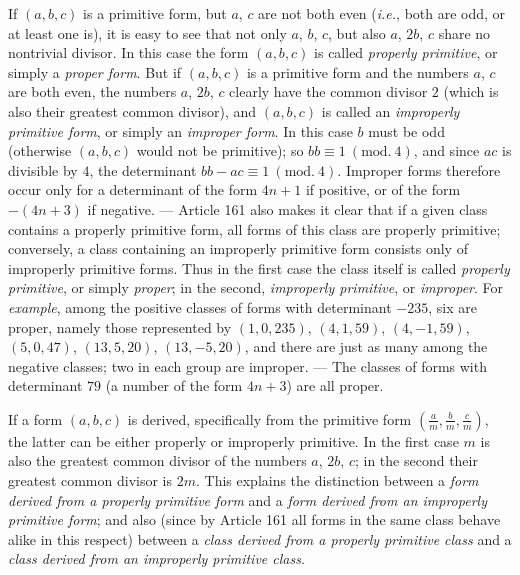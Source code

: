 If $(a,b,c)$ is a primitive form, but $a$, $c$ are not both even (\textit{i.e.}, both are odd, or at least one is), it is easy to see that not only $a$, $b$, $c$, but also $a$, $2b$, $c$ share no nontrivial divisor. In this case the form $(a,b,c)$ is called \textit{properly primitive}, or simply a \textit{proper form}. But if $(a,b,c)$ is a primitive form and the numbers $a$, $c$ are both even, the numbers $a$, $2b$, $c$ clearly have the common divisor $2$ (which is also their greatest common divisor), and $(a,b,c)$ is called an \textit{improperly primitive form}, or simply an \textit{improper form}. In this case $b$ must be odd (otherwise $(a,b,c)$ would not be primitive); so $bb\equiv1\ (\mathrm{mod.}\ 4)$, and since $ac$ is divisible by $4$, the determinant $bb-ac\equiv1\ (\mathrm{mod.}\ 4)$. Improper forms therefore occur only for a determinant of the form $4n+1$ if positive, or of the form $-(4n+3)$ if negative. --- Article 161 also makes it clear that if a given class contains a properly primitive form, all forms of this class are properly primitive; conversely, a class containing an improperly primitive form consists only of improperly primitive forms. Thus in the first case the class itself is called \textit{properly primitive}, or simply \textit{proper}; in the second, \textit{improperly primitive}, or \textit{improper}. For \textit{example}, among the positive classes of forms with determinant $-235$, six are proper, namely those represented by $(1,0,235)$, $(4,1,59)$, $(4,-1,59)$, $(5,0,47)$, $(13,5,20)$, $(13,-5,20)$, and there are just as many among the negative classes; two in each group are improper. --- The classes of forms with determinant $79$ (a number of the form $4n+3$) are all proper.

If a form $(a,b,c)$ is derived, specifically from the primitive form $\left(\frac{a}{m},\frac{b}{m},\frac{c}{m}\right)$, the latter can be either properly or improperly primitive. In the first case $m$ is also the greatest common divisor of the numbers $a$, $2b$, $c$; in the second their greatest common divisor is $2m$. This explains the distinction between a \textit{form derived from a properly primitive form} and a \textit{form derived from an improperly primitive form}; and also (since by Article 161 all forms in the same class behave alike in this respect)
between a \textit{class derived from a properly primitive class} and a \textit{class derived from an improperly primitive class}.

